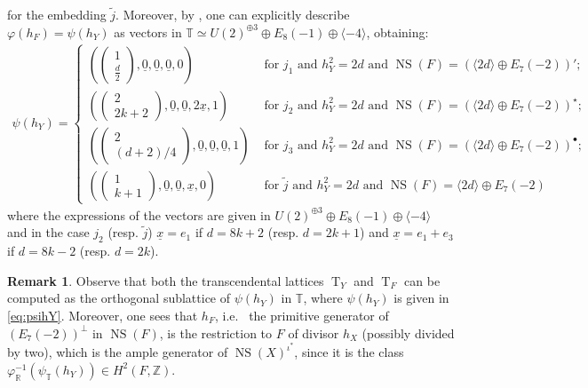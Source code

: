 \documentclass{amsart}
\theoremstyle{definition}
\newtheorem{rem}[thm]{Remark}
\numberwithin{equation}{section}
\numberwithin{equation}{section} \theoremstyle{definition}
\DeclareMathOperator{\NS}{NS}
\DeclareMathOperator{\T}{T}
\newcommand\Z{\mathbb{Z}}
\begin{document}
for the embedding $\widetilde{j}$. Moreover, by \cite[Proposition 3.5, 3.6, 3.7, 3.8]{CGKK}, one can explicitly describe $\varphi(h_F)=\psi(h_Y)$ as vectors in $\mathbb{T}\simeq U(2)^{\oplus 3}\oplus E_8(-1)\oplus \langle -4\rangle$, obtaining:
\begin{align}\label{eq:psihY}\psi(h_Y)=\left\{\begin{array}{ll}\left(\left(\begin{array}{c}1\\\frac{d}{2}\end{array}\right),\underline{0}, \underline{0}, \underline{0},0\right)&\mbox{ for }j_1\mbox{ and }h_Y^2=2d\mbox{ and }\NS(F)=\left(\langle 2d\rangle\oplus E_7(-2)\right)';\\
\left(\left(\begin{array} {c}2\\2k+2\end{array}\right),\underline{0}, \underline{0}, 2\underline{x},1\right)&\mbox{ for }j_2\mbox{ and }h_Y^2=2d\mbox{ and }\NS(F)=\left(\langle 2d\rangle\oplus E_7(-2)\right)^{\star};\\
\left(\left(\begin{array}{c}2\\(d+2)/4\end{array}\right),\underline{0}, \underline{0}, \underline{0},1\right)&\mbox{ for }j_3\mbox{ and }h_Y^2=2d\mbox{ and }\NS(F)=\left(\langle 2d\rangle\oplus E_7(-2)\right)^{\bullet};\\
\left(\left(\begin{array} {c}1\\k+1\end{array}\right),\underline{0}, \underline{0}, \underline{x},0\right)&\mbox{ for }\widetilde{j}\mbox{ and }h_Y^2=2d\mbox{ and }\NS(F)=\langle 2d\rangle\oplus E_7(-2)\end{array}\right.\end{align}
where the expressions of the vectors are given in $U(2)^{\oplus 3}\oplus E_8(-1)\oplus \langle -4 \rangle$ and in the case $j_2$ (resp. $\widetilde{j}$) $\underline{x}=e_1$ if $d=8k+2$ (resp. $d=2k+1$) and  $\underline{x}=e_1+e_3$ if $d=8k-2$ (resp. $d=2k$).



\begin{rem}\label{rem: the class HF restriction of HX}{\rm Observe that both the transcendental lattices $\T_Y$ and $\T_F$ can be computed as the orthogonal sublattice of $\psi(h_Y)$ in $\mathbb{T}$, where $\psi(h_Y)$ is given in \eqref{eq:psihY}. Moreover, one sees that $h_F$, i.e.~ the primitive generator of $\left(E_7(-2)\right)^{\perp}$ in $\NS(F)$, is the restriction to $F$ of divisor $h_X$ (possibly divided by two), which is the ample generator of $\NS(X)^{\iota^*}$, since it is the class $\varphi_{\mathbb{R}}^{-1}(\psi_{\mathbb{T}}(h_Y))\in H^2(F,\Z)$.}
\end{rem}
\end{document}
